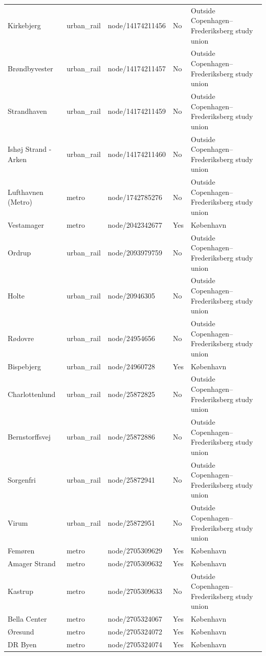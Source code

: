 \begin{landscape}
\begin{longtable}{>{\raggedright\arraybackslash}p{8.0cm}>{\raggedright\arraybackslash}p{2.4cm}>{\raggedright\arraybackslash}p{3.7cm}>{\raggedright\arraybackslash}p{1.5cm}>{\raggedright\arraybackslash}p{5.2cm}}
Kirkebjerg & urban\_\allowbreak{}rail & node/14174211456 & No & Outside Copenhagen--Frederiksberg study union \\
Brøndbyvester & urban\_\allowbreak{}rail & node/14174211457 & No & Outside Copenhagen--Frederiksberg study union \\
Strandhaven & urban\_\allowbreak{}rail & node/14174211459 & No & Outside Copenhagen--Frederiksberg study union \\
Ishøj Strand - Arken & urban\_\allowbreak{}rail & node/14174211460 & No & Outside Copenhagen--Frederiksberg study union \\
Lufthavnen (Metro) & metro & node/1742785276 & No & Outside Copenhagen--Frederiksberg study union \\
Vestamager & metro & node/2042342677 & Yes & København \\
Ordrup & urban\_\allowbreak{}rail & node/2093979759 & No & Outside Copenhagen--Frederiksberg study union \\
Holte & urban\_\allowbreak{}rail & node/20946305 & No & Outside Copenhagen--Frederiksberg study union \\
Rødovre & urban\_\allowbreak{}rail & node/24954656 & No & Outside Copenhagen--Frederiksberg study union \\
Bispebjerg & urban\_\allowbreak{}rail & node/24960728 & Yes & København \\
Charlottenlund & urban\_\allowbreak{}rail & node/25872825 & No & Outside Copenhagen--Frederiksberg study union \\
Bernstorffsvej & urban\_\allowbreak{}rail & node/25872886 & No & Outside Copenhagen--Frederiksberg study union \\
Sorgenfri & urban\_\allowbreak{}rail & node/25872941 & No & Outside Copenhagen--Frederiksberg study union \\
Virum & urban\_\allowbreak{}rail & node/25872951 & No & Outside Copenhagen--Frederiksberg study union \\
Femøren & metro & node/2705309629 & Yes & København \\
Amager Strand & metro & node/2705309632 & Yes & København \\
Kastrup & metro & node/2705309633 & No & Outside Copenhagen--Frederiksberg study union \\
Bella Center & metro & node/2705324067 & Yes & København \\
Øresund & metro & node/2705324072 & Yes & København \\
DR Byen & metro & node/2705324074 & Yes & København \\

\end{longtable}
\end{landscape}
